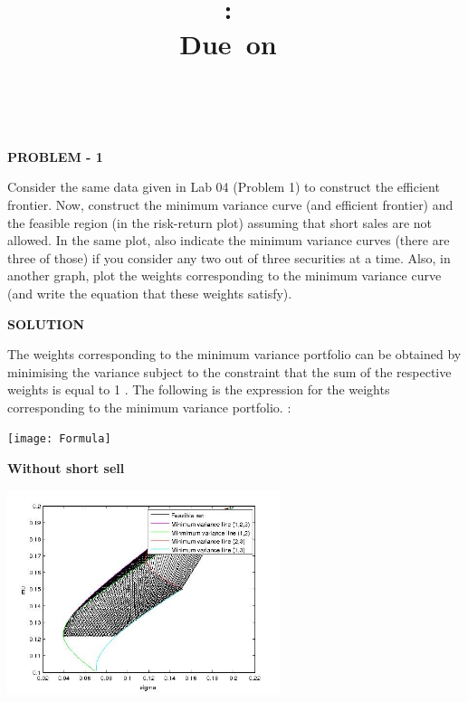 \documentclass{article}
\title{
\vspace{2in}
\textmd{\textbf{\hmwkClass:\ \hmwkTitle}}\\
\normalsize\vspace{0.1in}\small{Due\ on\ \hmwkDueDate}\\
\vspace{0.1in}\large{\textit{\hmwkClassInstructor\ \hmwkClassTime}}
\vspace{3in}
}
\author{\textbf{\hmwkAuthorName}}
\date{} %
\begin{document}
\maketitle



\newpage



\begin{center}
\textbf{PROBLEM - 1}
\end{center}
Consider the same data given in Lab 04 (Problem 1) to construct the efficient frontier. Now, construct the
minimum variance curve (and efficient frontier) and the feasible region (in the risk-return plot) assuming that
short sales are not allowed. In the same plot, also indicate the minimum variance curves (there are three of those)
if you consider any two out of three securities at a time. Also, in another graph, plot the weights corresponding
to the minimum variance curve (and write the equation that these weights satisfy).
\begin{center}
\textbf{SOLUTION}
\end{center}
The weights corresponding to the minimum variance portfolio can be obtained by minimising the variance subject to the constraint that the sum of the respective weights is equal to 1 . The following is the expression for the weights corresponding to the minimum variance portfolio. :
\begin{center}
\texttt{[image: Formula]}
\end{center}
\textbf{Without short sell}
\begin{center}
\includegraphics[width=80mm]{WithoutShortSell}
\end{center}
\end{document}
